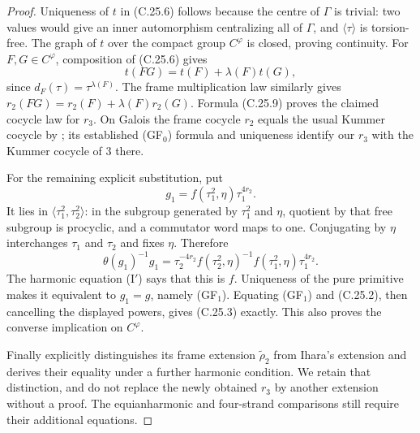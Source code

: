 \begin{proof}
Uniqueness of $t$ in (C.25.6) follows because
the centre of $\Gamma$ is trivial: two values
would give an inner automorphism centralizing
all of $\Gamma$, and $\langle\tau\rangle$
is torsion-free. The graph of $t$ over the
compact group $C^\varphi$ is closed, proving
continuity. For $F,G\in C^\varphi$,
composition of (C.25.6) gives
\[
       t(FG)=t(F)+\lambda(F)t(G),
\]
since $d_F(\tau)=\tau^{\lambda(F)}$.
The frame multiplication law similarly gives
$r_2(FG)=r_2(F)+\lambda(F)r_2(G)$.
Formula (C.25.9) proves the claimed cocycle
law for $r_3$. On Galois the frame cocycle
$r_2$ equals the usual Kummer cocycle by
\cite[\S5, before Proposition 5.1]{PBC_NT2002};
its established (GF$_0$) formula and uniqueness
identify our $r_3$ with the Kummer cocycle of
$3$ there.

For the remaining explicit substitution, put
\[
       g_1=f(\tau_1^2,\eta)\tau_1^{4r_2}.
\]
It lies in $\langle\tau_1^2,\tau_2^2\rangle$:
in the subgroup generated by $\tau_1^2$ and
$\eta$, quotient by that free subgroup is
procyclic, and a commutator word maps to one.
Conjugating by $\eta$ interchanges $\tau_1$
and $\tau_2$ and fixes $\eta$. Therefore
\[
 \theta(g_1)^{-1}g_1
 =\tau_2^{-4r_2}f(\tau_2^2,\eta)^{-1}
                      f(\tau_1^2,\eta)\tau_1^{4r_2}.
 \tag{C.25.10}
\]
The harmonic equation (I$'$) says that this
is $f$. Uniqueness of the pure primitive
makes it equivalent to $g_1=g$, namely
(GF$_1$). Equating (GF$_1$) and (C.25.2),
then cancelling the displayed powers, gives
(C.25.3) exactly. This also proves the
converse implication on $C^\varphi$.

Finally \cite[Proposition 5.1 and the preceding
paragraph]{PBC_NT2002} explicitly distinguishes
its frame extension $\widetilde\rho_2$ from
Ihara's extension and derives their equality
under a further harmonic condition. We retain
that distinction, and do not replace the
newly obtained $r_3$ by another extension
without a proof. The equianharmonic and
four-strand comparisons still require their
additional equations.
\end{proof}

